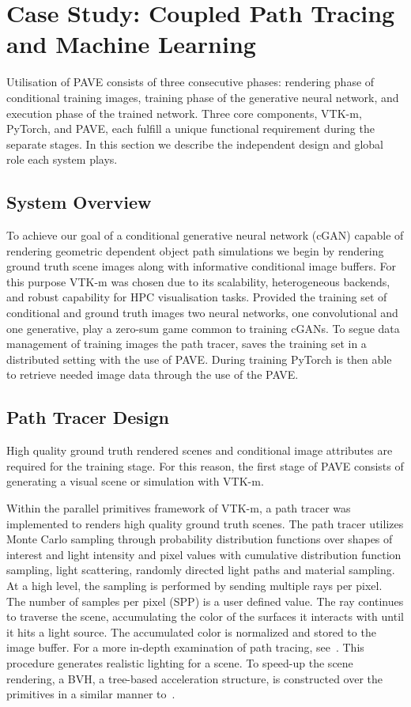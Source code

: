\section{Case Study: Coupled Path Tracing and Machine Learning}

Utilisation of PAVE consists of three consecutive phases: rendering phase of conditional training images, training phase of the generative neural network, and execution phase of the trained network. Three core components, VTK-m, PyTorch, and PAVE, each fulfill a unique functional requirement during the separate stages. In this section we describe the independent design and global role each system plays.

\subsection{System Overview}
 
To achieve our goal of a conditional generative neural network (cGAN) capable of rendering geometric dependent object path simulations we begin by rendering  ground truth scene images along with informative conditional image buffers. For this purpose VTK-m was chosen due to its scalability, heterogeneous backends, and robust capability for HPC visualisation tasks. Provided the training set of conditional and ground truth images two neural networks, one convolutional and one generative, play a zero-sum game common to training cGANs. To segue data management of training images the path tracer, saves the training set in a distributed setting with the use of PAVE. During training PyTorch is then able to retrieve needed image data through the use of the PAVE.

\subsection{Path Tracer Design}

High quality ground truth rendered scenes and conditional image attributes are required for the training stage. For this reason, the first stage of PAVE consists of generating a visual scene or simulation with VTK-m. 

Within the parallel primitives framework of VTK-m, a path tracer was implemented to renders high quality ground truth scenes. The path tracer utilizes Monte Carlo sampling through probability distribution functions over shapes of interest and light intensity and pixel values with cumulative distribution function sampling, light scattering, randomly directed light paths and material sampling. At a high level, the sampling is performed by sending multiple rays per pixel. The number of samples per pixel (SPP) is a user defined value. The ray continues to traverse the scene, accumulating the color of the surfaces it interacts with until it hits a light source. The accumulated color is normalized and stored to the image buffer. For a more in-depth examination of path tracing, see~\cite{Pharr:2016:PBR:3044800}. This procedure generates realistic lighting for a scene. To speed-up the scene rendering, a BVH, a tree-based acceleration structure, is constructed over the primitives in a similar manner to~\cite{95260c8902184519bd98df42d2572515}. 

